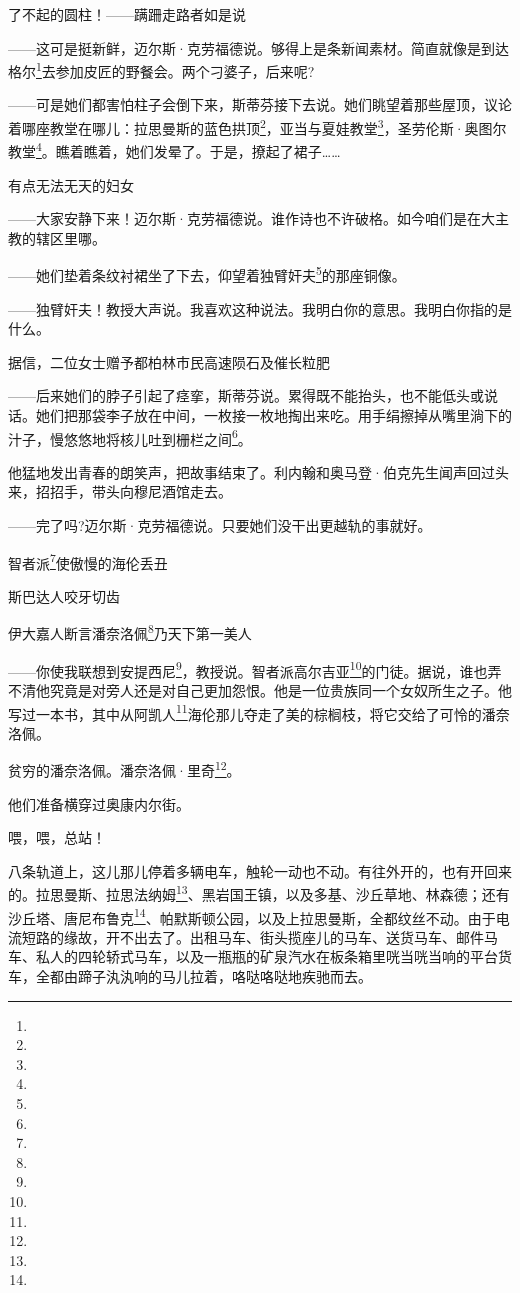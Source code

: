 \par 了不起的圆柱！——蹒跚走路者如是说
\par ——这可是挺新鲜，迈尔斯·克劳福德说。够得上是条新闻素材。简直就像是到达格尔\footnote{}去参加皮匠的野餐会。两个刁婆子，后来呢?
\par ——可是她们都害怕柱子会倒下来，斯蒂芬接下去说。她们眺望着那些屋顶，议论着哪座教堂在哪儿：拉思曼斯的蓝色拱顶\footnote{}，亚当与夏娃教堂\footnote{}，圣劳伦斯·奥图尔教堂\footnote{}。瞧着瞧着，她们发晕了。于是，撩起了裙子……
\par 有点无法无天的妇女
\par ——大家安静下来！迈尔斯·克劳福德说。谁作诗也不许破格。如今咱们是在大主教的辖区里哪。
\par ——她们垫着条纹衬裙坐了下去，仰望着独臂奸夫\footnote{}的那座铜像。
\par ——独臂奸夫！教授大声说。我喜欢这种说法。我明白你的意思。我明白你指的是什么。
\par 据信，二位女士赠予都柏林市民高速陨石及催长粒肥
\par ——后来她们的脖子引起了痉挛，斯蒂芬说。累得既不能抬头，也不能低头或说话。她们把那袋李子放在中间，一枚接一枚地掏出来吃。用手绢擦掉从嘴里淌下的汁子，慢悠悠地将核儿吐到栅栏之间\footnote{}。
\par 他猛地发出青春的朗笑声，把故事结束了。利内翰和奥马登·伯克先生闻声回过头来，招招手，带头向穆尼酒馆走去。
\par ——完了吗?迈尔斯·克劳福德说。只要她们没干出更越轨的事就好。
\par 智者派\footnote{}使傲慢的海伦丢丑
\par  斯巴达人咬牙切齿
\par  伊大嘉人断言潘奈洛佩\footnote{}乃天下第一美人
\par ——你使我联想到安提西尼\footnote{}，教授说。智者派高尔吉亚\footnote{}的门徒。据说，谁也弄不清他究竟是对旁人还是对自己更加怨恨。他是一位贵族同一个女奴所生之子。他写过一本书，其中从阿凯人\footnote{}海伦那儿夺走了美的棕榈枝，将它交给了可怜的潘奈洛佩。
\par 贫穷的潘奈洛佩。潘奈洛佩·里奇\footnote{}。
\par 他们准备横穿过奥康内尔街。
\par 喂，喂，总站！
\par 八条轨道上，这儿那儿停着多辆电车，触轮一动也不动。有往外开的，也有开回来的。拉思曼斯、拉思法纳姆\footnote{}、黑岩国王镇，以及多基、沙丘草地、林森德；还有沙丘塔、唐尼布鲁克\footnote{}、帕默斯顿公园，以及上拉思曼斯，全都纹丝不动。由于电流短路的缘故，开不出去了。出租马车、街头揽座儿的马车、送货马车、邮件马车、私人的四轮轿式马车，以及一瓶瓶的矿泉汽水在板条箱里咣当咣当响的平台货车，全都由蹄子汍汍响的马儿拉着，咯哒咯哒地疾驰而去。

